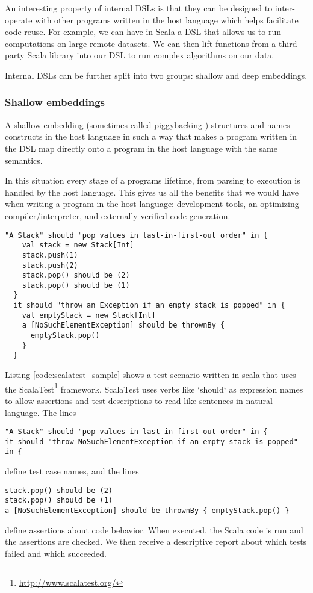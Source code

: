 An interesting property of internal DSLs is that they can be designed to inter-operate with other programs written in the host language which helps facilitate code reuse.
For example, we can have in Scala a DSL that allows us to run computations on large remote datasets.
We can then lift functions from a third-party Scala library into our DSL to run complex algorithms on our data.

Internal DSLs can be further split into two groups: shallow and deep embeddings.

\subsubsection{Shallow embeddings}

A shallow embedding (sometimes called piggybacking \autocite{Mernik:2005}) structures and names constructs in the host language in such a way that makes a program written in the DSL map directly onto a program in the host language with the same semantics.

In this situation every stage of a programs lifetime, from parsing to execution is handled by the host language.
This gives us all the benefits that we would have when writing a program in the host language: development tools, an optimizing compiler/interpreter, and externally verified code generation.

\begin{lstlisting}[caption=Example ScalaTest code, label=code:scalatest_sample]
  "A Stack" should "pop values in last-in-first-out order" in {
    val stack = new Stack[Int]
    stack.push(1)
    stack.push(2)
    stack.pop() should be (2)
    stack.pop() should be (1)
  }
  it should "throw an Exception if an empty stack is popped" in {
    val emptyStack = new Stack[Int]
    a [NoSuchElementException] should be thrownBy {
      emptyStack.pop()
    } 
  }
\end{lstlisting}

Listing \ref{code:scalatest_sample} shows a test scenario written in scala that uses the ScalaTest\footnote{\url{http://www.scalatest.org/}} framework.
ScalaTest uses verbs like `should` as expression names to allow assertions and test descriptions to read like sentences in natural language.
The lines
\begin{verbatim}
"A Stack" should "pop values in last-in-first-out order" in {
it should "throw NoSuchElementException if an empty stack is popped" in {
\end{verbatim}
define test case names, and the lines
\begin{verbatim}
stack.pop() should be (2)
stack.pop() should be (1)
a [NoSuchElementException] should be thrownBy { emptyStack.pop() }
\end{verbatim}
define assertions about code behavior.
When executed, the Scala code is run and the assertions are checked.
We then receive a descriptive report about which tests failed and which succeeded.


